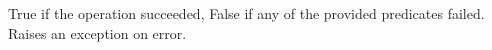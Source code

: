 True if the operation succeeded, False if any of the provided predicates failed.
Raises an exception on error.

